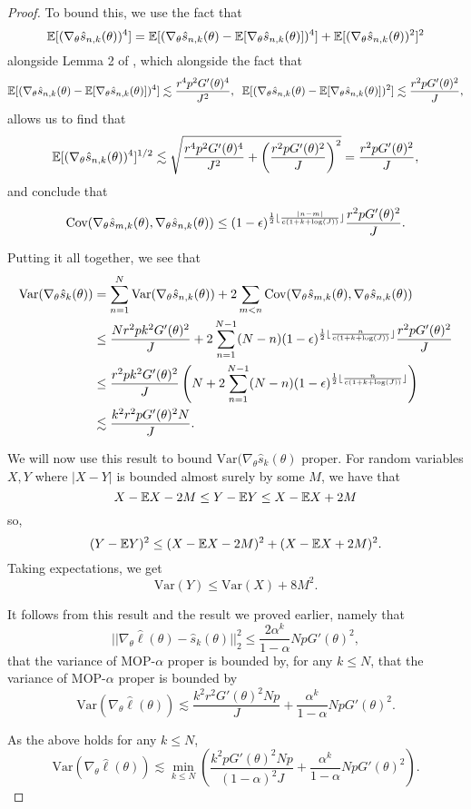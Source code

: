 \begin{proof}
To bound this, we use the fact that $$\mathbb{E}[(\nabla_\theta\hat s_{n,k}(\theta))^4] = \mathbb{E}[(\nabla_\theta\hat s_{n,k}(\theta)-\mathbb{E}[\nabla_\theta\hat s_{n,k}(\theta)])^4]+\mathbb{E}[(\nabla_\theta\hat s_{n,k}(\theta))^2]^2$$
alongside Lemma 2 of \cite{karjalainen23}, which alongside the fact that
$$\mathbb{E}[(\nabla_\theta\hat s_{n,k}(\theta)-\mathbb{E}[\nabla_\theta\hat s_{n,k}(\theta)])^4] \lesssim \frac{r^4p^2G'(\theta)^4}{J^2}, \;\; \mathbb{E}[(\nabla_\theta\hat s_{n,k}(\theta)-\mathbb{E}[\nabla_\theta\hat s_{n,k}(\theta)])^2] \lesssim \frac{r^2pG'(\theta)^2}{J},$$
allows us to find that 
$$\mathbb{E}[(\nabla_\theta\hat s_{n,k}(\theta))^4]^{1/2} \lesssim  \sqrt{\frac{r^4p^2G'(\theta)^4}{J^2}+\left(\frac{r^2pG'(\theta)^2}{J}\right)^2} = \frac{r^2pG'(\theta)^2}{J},$$
and conclude that 
$$\text{Cov}(\nabla_\theta\hat s_{m,k}(\theta), \nabla_\theta\hat s_{n,k}(\theta)) \leq (1-\epsilon)^{\frac{1}{2}\lfloor \frac{|n-m|}{c(1+k+\log(J))} \rfloor}\frac{r^2pG'(\theta)^2}{J}.$$


Putting it all together, we see that
\begin{align}
    \text{Var}(\nabla_\theta \hat s_{k}(\theta)) &= \sum_{n=1}^N \text{Var}(\nabla_\theta\hat s_{n,k}(\theta)) + 2\sum_{m<n} \text{Cov}(\nabla_\theta\hat s_{m,k}(\theta),\nabla_\theta\hat s_{n,k}(\theta))\\
    &\leq \frac{Nr^2pk^2G'(\theta)^2}{J} + 2\sum_{n=1}^{N-1} (N-n)(1-\epsilon)^{\frac{1}{2}\lfloor \frac{n}{c(1+k+\log(J))} \rfloor}\frac{r^2pG'(\theta)^2}{J} \\
    &\leq \frac{r^2pk^2G'(\theta)^2}{J} \left(N + 2\sum_{n=1}^{N-1} (N-n) (1-\epsilon)^{\frac{1}{2}\lfloor \frac{n}{c(1+k+\log(J))} \rfloor}\right) \\
    &\lesssim \frac{k^2r^2pG'(\theta)^2N}{J}.
\end{align}

We will now use this result to bound $\text{Var}(\nabla_\theta \hat s_k(\theta)$ proper. For random variables $X,Y$ where $|X-Y|$ is bounded almost surely by some $M$, we have that 
$$X-\mathbb{E} X - 2M \leq Y - \mathbb{E} Y \leq X - \mathbb{E} X + 2M$$
so,
$$(Y-\mathbb{E} Y)^2 \leq (X-\mathbb{E} X - 2M)^2 + (X-\mathbb{E} X +2M)^2.$$
Taking expectations, we get
$$\text{Var}(Y) \leq \text{Var}(X) + 8M^2.$$

It follows from this result and the result we proved earlier, namely that
$$||\nabla_\theta\hat\ell(\theta) - \hat s_k(\theta)||_2^2 \leq \frac{2\alpha^k}{1-\alpha}NpG'(\theta)^2,$$
that the variance of MOP-$\alpha$ proper is bounded by, for any $k \leq N$,
that the variance of MOP-$\alpha$ proper is bounded by
$$\text{Var}(\nabla_\theta \hat\ell(\theta)) \lesssim \frac{k^2r^2G'(\theta)^2Np}{J} + \frac{\alpha^{k}}{1-\alpha}NpG'(\theta)^2.$$

As the above holds for any $k \leq N$,
$$\text{Var}(\nabla_\theta \hat\ell(\theta)) \lesssim \min_{k\leq N} \left(\frac{k^2pG'(\theta)^2Np}{(1-\alpha)^2J} + \frac{\alpha^{k}}{1-\alpha}NpG'(\theta)^2 \right).$$
\end{proof}


